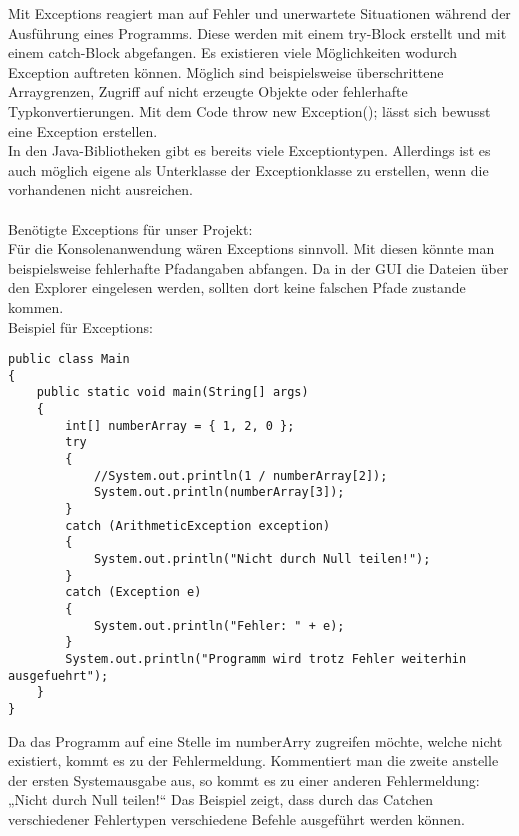 Mit Exceptions reagiert man auf Fehler und unerwartete Situationen während der Ausführung eines Programms. Diese werden mit einem try-Block erstellt und mit einem catch-Block abgefangen. Es existieren viele Möglichkeiten wodurch Exception auftreten können. Möglich sind beispielsweise überschrittene Arraygrenzen, Zugriff auf nicht erzeugte Objekte oder fehlerhafte Typkonvertierungen. Mit dem Code throw new Exception(); lässt sich bewusst eine Exception erstellen.\\
In den Java-Bibliotheken gibt es bereits viele Exceptiontypen. Allerdings ist es auch möglich eigene als Unterklasse der Exceptionklasse zu erstellen, wenn die vorhandenen nicht ausreichen.\\\\
Benötigte Exceptions für unser Projekt: \\
Für die Konsolenanwendung wären Exceptions sinnvoll. Mit diesen könnte man beispielsweise fehlerhafte Pfadangaben abfangen. Da in der GUI die Dateien über den Explorer eingelesen werden, sollten dort keine falschen Pfade zustande kommen.\\
Beispiel für Exceptions:
\begin{lstlisting}
public class Main
{
	public static void main(String[] args)
	{		
		int[] numberArray = { 1, 2, 0 };
		try
		{
			//System.out.println(1 / numberArray[2]);
			System.out.println(numberArray[3]);
		}
		catch (ArithmeticException exception)
		{
			System.out.println("Nicht durch Null teilen!");
		}
		catch (Exception e)
		{
			System.out.println("Fehler: " + e);
		}
		System.out.println("Programm wird trotz Fehler weiterhin ausgefuehrt");
	}
}
\end{lstlisting}
Da das Programm auf eine Stelle im numberArry zugreifen möchte, welche nicht existiert, kommt es zu der Fehlermeldung. Kommentiert man die zweite anstelle der ersten Systemausgabe aus, so kommt es zu einer anderen Fehlermeldung: „Nicht durch Null teilen!“ Das Beispiel zeigt, dass durch das Catchen verschiedener Fehlertypen verschiedene Befehle ausgeführt werden können.
\nsecend
